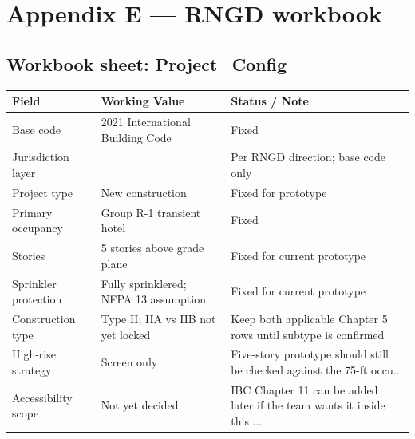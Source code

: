 \documentclass[10pt]{article}
\begin{document}
\section*{Appendix E --- RNGD workbook}
{\small \subsection*{Workbook sheet: Project\_Config}
\begin{longtable}{p{5.20cm}p{5.20cm}p{5.20cm}}
\toprule
\textbf{Field} & \textbf{Working Value} & \textbf{Status / Note} \\ \midrule \endhead
Base code & 2021 International Building Code & Fixed \\
Jurisdiction layer &  & Per RNGD direction; base code only \\
Project type & New construction & Fixed for prototype \\
Primary occupancy & Group R-1 transient hotel & Fixed \\
Stories & 5 stories above grade plane & Fixed for current prototype \\
Sprinkler protection & Fully sprinklered; NFPA 13 assumption & Fixed for current prototype \\
Construction type & Type II; IIA vs IIB not yet locked & Keep both applicable Chapter 5 rows until subtype is confirmed \\
High-rise strategy & Screen only & Five-story prototype should still be checked against the 75-ft occu... \\
Accessibility scope & Not yet decided & IBC Chapter 11 can be added later if the team wants it inside this ... \\
\bottomrule\end{longtable}
}
\end{document}
